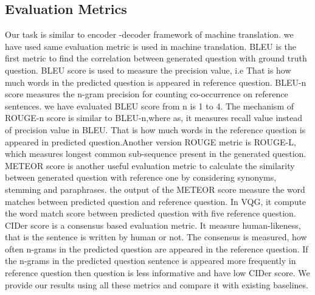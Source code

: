 \documentclass[11pt,a4paper]{article}
\begin{document}
\subsection{Evaluation Metrics}
Our task is similar to encoder -decoder framework of machine translation. we have used same evaluation metric is used in machine translation. BLEU\cite{Papineni_ACL2002} is the first metric to find the correlation between generated question with ground truth question. BLEU score is used to measure the precision value, i.e That is how much words in the predicted question is appeared in reference question. BLEU-n score measures the n-gram precision for counting co-occurrence on reference sentences. we have evaluated BLEU score from n is 1 to 4. The mechanism of ROUGE-n\cite{Lin_ACL2004} score  is similar to BLEU-n,where as, it measures recall value instead of precision value in BLEU. That is how much words in the reference question is appeared in predicted question.Another version ROUGE metric is ROUGE-L, which  measures longest common sub-sequence present in the generated question. METEOR\cite{Banerjee_ACL2005} score is another useful evaluation metric to calculate the similarity between generated question with reference one by considering synonyms, stemming and paraphrases. the output of the METEOR score measure the word matches between predicted question and reference question. In VQG, it compute the word match score between predicted question with five reference question. CIDer\cite{Vedantam_CVPR2015} score is a consensus based evaluation metric.  It measure human-likeness, that is the sentence is written by human or not. The consensus is measured, how often n-grams in the predicted question are appeared in the reference question. If the n-grams in the predicted question sentence is appeared more frequently in reference question then question is less informative and have low CIDer score. We provide our results using all these metrics and compare it with existing baselines. 
	
\end{document}
